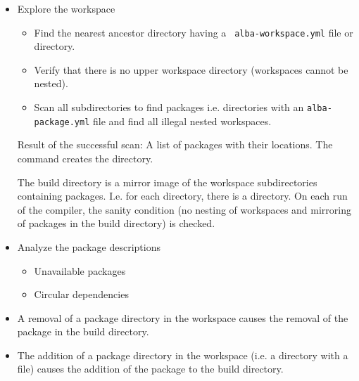 \begin{itemize}

\item Explore the workspace
  \begin{itemize}

  \item Find the nearest ancestor directory having a {\tt\small
      alba-workspace.yml} file or  directory.

  \item Verify that there is no upper workspace directory (workspaces cannot
    be nested).

  \item Scan all subdirectories to find packages i.e. directories with an
    {\tt\small alba-package.yml} file and find all illegal nested workspaces.
  \end{itemize}


  Result of the successful scan: A list of packages with their locations. The
  command  creates the  directory.

  The build directory is a mirror image of the workspace subdirectories
  containing packages. I.e. for each  directory, there is a
   directory. On each run of the compiler, the
  sanity condition (no nesting of workspaces and mirroring of packages in the
  build directory) is checked.



\item Analyze the package descriptions
  \begin{itemize}
  \item Unavailable packages
  \item Circular dependencies
  \end{itemize}
\end{itemize}


\begin{itemize}

\item A removal of a package directory in the workspace causes the removal of
  the package in the build directory.

\item The addition of a package directory in the workspace (i.e. a directory
  with a  file) causes the addition of the package to
  the build directory.

\end{itemize}



